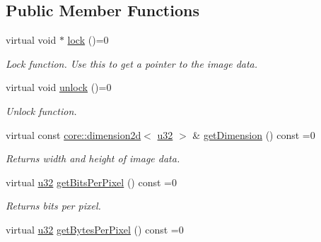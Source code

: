 \subsection*{Public Member Functions}
\begin{DoxyCompactItemize}
\item 
virtual void $\ast$ \hyperlink{classirr_1_1video_1_1IImage_a5c4b0b5fa2a5f253f93c1b038e20d204}{lock} ()=0
\begin{DoxyCompactList}\small\item\em Lock function. Use this to get a pointer to the image data. \end{DoxyCompactList}\item 
virtual void \hyperlink{classirr_1_1video_1_1IImage_ad0f902d74a948ee66be2d70dc90ed38d}{unlock} ()=0
\begin{DoxyCompactList}\small\item\em Unlock function. \end{DoxyCompactList}\item 
\mbox{\label{classirr_1_1video_1_1IImage_a3618c9793b7a1f3383a5c3944436a2be}} 
virtual const \hyperlink{classirr_1_1core_1_1dimension2d}{core\+::dimension2d}$<$ \hyperlink{namespaceirr_a0416a53257075833e7002efd0a18e804}{u32} $>$ \& \hyperlink{classirr_1_1video_1_1IImage_a3618c9793b7a1f3383a5c3944436a2be}{get\+Dimension} () const =0
\begin{DoxyCompactList}\small\item\em Returns width and height of image data. \end{DoxyCompactList}\item 
\mbox{\label{classirr_1_1video_1_1IImage_adf842a506b2984f3f13d64b4967146e9}} 
virtual \hyperlink{namespaceirr_a0416a53257075833e7002efd0a18e804}{u32} \hyperlink{classirr_1_1video_1_1IImage_adf842a506b2984f3f13d64b4967146e9}{get\+Bits\+Per\+Pixel} () const =0
\begin{DoxyCompactList}\small\item\em Returns bits per pixel. \end{DoxyCompactList}\item 
\mbox{\label{classirr_1_1video_1_1IImage_a14509044ca5215b9714ab1091b0e86d0}} 
virtual \hyperlink{namespaceirr_a0416a53257075833e7002efd0a18e804}{u32} \hyperlink{classirr_1_1video_1_1IImage_a14509044ca5215b9714ab1091b0e86d0}{get\+Bytes\+Per\+Pixel} () const =0

\end{DoxyCompactItemize}
